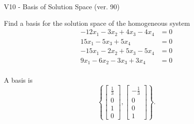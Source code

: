 \begin{exercise}
  \begin{exerciseTitle}V10 - Basis of Solution Space (ver. 90)\end{exerciseTitle}
  \begin{exerciseStatement}
    Find a basis for the solution space of the homogeneous system 
\begin{align*}
 -12 x_ 1 -3 x_ 2 + 4 x_ 3 -4 x_ 4 &= 0  \\ 
  15 x_ 1 -5 x_ 3 + 5 x_ 4 &= 0  \\ 
  -15 x_ 1 -2 x_ 2 + 5 x_ 3 -5 x_ 4 &= 0  \\ 
  9 x_ 1 -6 x_ 2 -3 x_ 3 + 3 x_ 4 &= 0  \\ 
 \end{align*}


 
  \end{exerciseStatement}

  \begin{exerciseAnswer}
   A basis is   
\[\left\{\left[\begin{array}{c}
\frac{1}{3} \\
0 \\
1 \\
0
\end{array}\right] , \left[\begin{array}{c}
-\frac{1}{3} \\
0 \\
0 \\
1
\end{array}\right]\right\}.\]

  


  \end{exerciseAnswer}
\end{exercise}